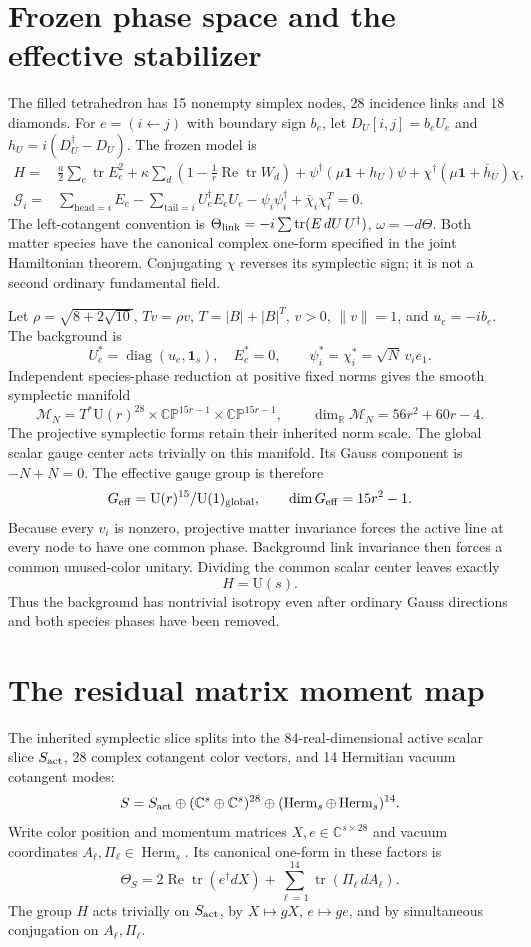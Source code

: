 \documentclass[11pt,a4paper]{article}
\newcommand{\id}{\mathbf1}\newcommand{\tr}{\operatorname{tr}}\newcommand{\diag}{\operatorname{diag}}\newcommand{\Rea}{\operatorname{Re}}
\begin{document}
\section{Frozen phase space and the effective stabilizer}
The filled tetrahedron has 15 nonempty simplex nodes, 28 incidence links and 18 diamonds. For $e=(i\leftarrow j)$ with boundary sign $b_e$, let $D_U[i,j]=b_eU_e$ and $h_U=i(D_U^\dagger-D_U)$. The frozen model is
\begin{align*}
H={}&\frac a2\sum_e\tr E_e^2+\kappa\sum_d\left(1-\frac1r\Rea\tr W_d\right)
+\psi^\dagger(\mu\id+h_U)\psi+\chi^\dagger(\mu\id+\bar h_U)\chi,\\
\mathcal G_i={}&\sum_{\mathrm{head}=i}E_e-\sum_{\mathrm{tail}=i}U_e^\dagger E_eU_e
-\psi_i\psi_i^\dagger+\bar\chi_i\chi_i^T=0.
\end{align*}
The left-cotangent convention is $\Theta_{\rm link}=-i\sum\tr(E\,dU\,U^\dagger)$, $\omega=-d\Theta$. Both matter species have the canonical complex one-form specified in the joint Hamiltonian theorem. Conjugating $\chi$ reverses its symplectic sign; it is not a second ordinary fundamental field.

Let $\rho=\sqrt{8+2\sqrt{10}}$, $Tv=\rho v$, $T=|B|+|B|^T$, $v>0$, $\|v\|=1$, and $u_e=-ib_e$. The background is
\[
U_e^*=\diag(u_e,\id_s),\quad E_e^*=0,\qquad
\psi_i^*=\chi_i^*=\sqrt N\,v_i e_1.
\]
Independent species-phase reduction at positive fixed norms gives the smooth symplectic manifold
\[
\mathcal M_N=T^*\mathrm U(r)^{28}\times
\mathbb {CP}^{15r-1}\times\mathbb {CP}^{15r-1},
\qquad \dim_{\mathbb R}\mathcal M_N=56r^2+60r-4.
\]
The projective symplectic forms retain their inherited norm scale. The global scalar gauge center acts trivially on this manifold. Its Gauss component is $-N+N=0$. The effective gauge group is therefore
\[
G_{\rm eff}=\mathrm U(r)^{15}/\mathrm U(1)_{\rm global},
\qquad \dim G_{\rm eff}=15r^2-1.
\]
Because every $v_i$ is nonzero, projective matter invariance forces the active line at every node to have one common phase. Background link invariance then forces a common unused-color unitary. Dividing the common scalar center leaves exactly
\[
H=\mathrm U(s).
\]
Thus the background has nontrivial isotropy even after ordinary Gauss directions and both species phases have been removed.

\newpage
\section{The residual matrix moment map}
The inherited symplectic slice splits into the 84-real-dimensional active scalar slice $S_{\rm act}$, 28 complex cotangent color vectors, and 14 Hermitian vacuum cotangent modes:
\[
S=S_{\rm act}\oplus (\mathbb C^s\oplus\mathbb C^s)^{28}
\oplus(\operatorname{Herm}_s\oplus\operatorname{Herm}_s)^{14}.
\]
Write color position and momentum matrices $X,e\in\mathbb C^{s\times28}$ and vacuum coordinates $A_\ell,\Pi_\ell\in\operatorname{Herm}_s$. Its canonical one-form in these factors is
\[
\Theta_S=2\Rea\tr(e^\dagger dX)+\sum_{\ell=1}^{14}\tr(\Pi_\ell\,dA_\ell).
\]
The group $H$ acts trivially on $S_{\rm act}$, by $X\mapsto gX$, $e\mapsto ge$, and by simultaneous conjugation on $A_\ell,\Pi_\ell$.
\end{document}
